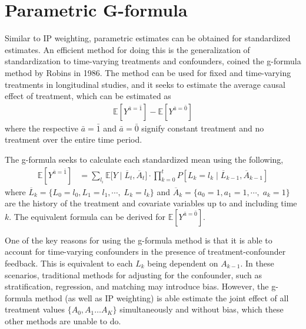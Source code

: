 \section{Parametric G-formula} 
Similar to IP weighting, parametric estimates can be obtained for standardized estimates.  An efficient method for doing this is the generalization of standardization to time-varying treatments and confounders, coined the g-formula method by Robins in 1986.\cite{hernan_robins_2016, robins1986new, wright2015international}  The method can be used for fixed and time-varying treatments in longitudinal studies, and it seeks to estimate the average causal effect of treatment, which can be estimated as 
\begin{align} 
\mathbb{E}[Y^{\bar{a} = \bar{1}}] - \mathbb{E}[Y^{\bar{a} = \bar{0}}] 
\end{align} 
where the respective $\bar{a} = \bar{1}$ and $\bar{a} = \bar{0}$ signify constant treatment and no treatment over the entire time period.  

The g-formula seeks to calculate each standardized mean using the following, 
\begin{align} \label{eq:3} 
\mathbb{E}[Y^{\bar{a}= \bar{1}}] &= \sum_{l_i}  \mathbb{E}\big[Y \mid  \overline{L}_{t}, \overline{A}_{t} \big]\cdot \prod_{k=0}^t P[L_k = l_k \mid \overline{L}_{k-1}, \overline{A}_{k-1}]
\end{align}
where $\overline{L}_k = \{L_{0} = l_0, L_{1} = l_1,  \cdots, \; L_{k} = l_k\}$ and $\overline{A}_k = \{a_{0} = 1, a_{1} = 1,  \cdots, \; a_{k} = 1\}$ are the history of the treatment and covariate variables up to and including time $k$.  The equivalent formula can be derived for $ \mathbb{E}[Y^{\bar{a} = \bar{0}}]$.   


One of the key reasons for using the g-formula method is that it is able to account for time-varying confounders in the presence of treatment-confounder feedback.  This is equivalent to each $L_k$ being dependent on $A_{k-1}$.\cite{robins1986new}  In these scenarios, traditional methods for adjusting for the confounder, such as stratification, regression, and matching may introduce bias. However, the g-formula method (as well as IP weighting) is able estimate the joint effect of all treatment values $\{A_0, A_1 \dots A_K \}$ simultaneously and without bias, which these other methods are unable to do.\cite{fitzmaurice2008longitudinal, wright2015international}  

